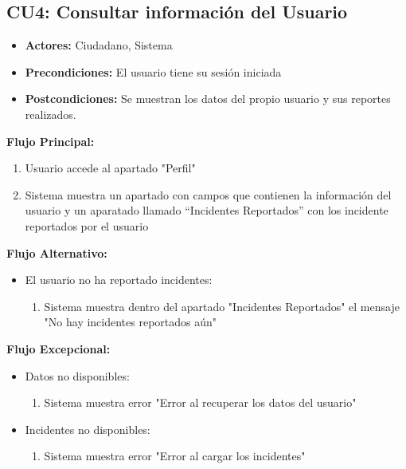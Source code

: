 \begin{multicols}{2}
\subsection*{CU4: Consultar información del Usuario}
\begin{itemize}
    \item \textbf{Actores:} Ciudadano, Sistema
    \item \textbf{Precondiciones:} El usuario tiene su sesión iniciada
    \item \textbf{Postcondiciones:} Se muestran los datos del propio usuario y sus reportes realizados.
\end{itemize}
\textbf{Flujo Principal:}
\begin{enumerate}
    \item Usuario accede al apartado "Perfil"
    \item Sistema muestra un apartado con campos que contienen la información del usuario y un aparatado llamado ``Incidentes Reportados'' con los incidente reportados por el usuario
\end{enumerate}

\textbf{Flujo Alternativo:}
\begin{itemize}
    \item El usuario no ha reportado incidentes:
    \begin{enumerate}
        \item Sistema muestra dentro del apartado "Incidentes Reportados" el mensaje "No hay incidentes reportados aún" 
    \end{enumerate}
\end{itemize}

\textbf{Flujo Excepcional:}
\begin{itemize}
    \item Datos no disponibles:
    \begin{enumerate}
        \item Sistema muestra error "Error al recuperar los datos del usuario"
    \end{enumerate}
    \item Incidentes no disponibles:
    \begin{enumerate}
        \item Sistema muestra error "Error al cargar los incidentes"
    \end{enumerate}
\end{itemize}


\end{multicols}
